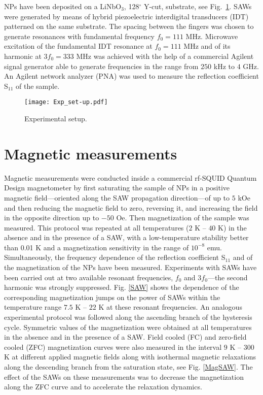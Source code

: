 \documentclass[aps,prb,floats,twocolumn]{revtex4}
\begin{document}
NPs have been deposited on a LiNbO$_{3}$, 128$^{\circ}$ Y-cut, substrate, see Fig.\ \ref{setup}. SAWs were generated by means of hybrid piezoelectric interdigital transducers (IDT) patterned on the same substrate. The spacing between the fingers was chosen to generate resonances with fundamental frequency $f_{0}=111$ MHz. Microwave excitation of the fundamental IDT resonance at $f_{0}=111$ MHz and of its harmonic at $3f_{0}=333$ MHz was achieved with the help of a commercial Agilent signal generator able to generate frequencies in the range from $250$ kHz to $4$ GHz. An Agilent network analyzer (PNA) was used to measure the reflection coefficient S$_{11}$ of the sample.
 
\begin{figure}[ht]
\begin{center}
\texttt{[image: Exp\_set-up.pdf]}
\caption{Experimental setup.}
\label{setup}
\end{center}
\end{figure}

\section{Magnetic measurements}\label{magnetic}
Magnetic measurements were conducted inside a commercial rf-SQUID Quantum Design magnetometer by first saturating the sample of NPs in a positive magnetic field---oriented along the SAW propagation direction---of up to $5$ kOe and then reducing the magnetic field to zero, reversing it, and increasing the field in the opposite direction up to $-50$ Oe. Then magnetization of the sample was measured. This protocol was repeated at all temperatures ($2$ K -- $40$ K) in the absence and in the presence of a SAW, with a low-temperature stability better than 0.01 K and a magnetization sensitivity in the range of $10^{-8}$ emu.\cite{SQUID} Simultaneously, the frequency dependence of the reflection coefficient S$_{11}$ and of the magnetization of the NPs have been measured. Experiments with SAWs have been carried out at two available resonant frequencies, $f_{0}$ and $3f_{0}$---the second harmonic was strongly suppressed. Fig. \ref{SAW} shows the dependence of the corresponding magnetization jumps on the power of SAWs within the temperature range $7.5$ K -- $22$ K at these resonant frequencies. An analogous experimental protocol was followed along the ascending branch of the hysteresis cycle. Symmetric values of the magnetization were obtained at all temperatures in the absence and in the presence of a SAW. Field cooled (FC) and zero-field cooled (ZFC) magnetization curves were also measured in the interval $9$ K -- $300$ K at different applied magnetic fields along with isothermal magnetic relaxations along the descending branch from the saturation state, see Fig. \ref{MagSAW}. The effect of the SAWs on these measurements was to decrease the magnetization along the ZFC curve and to accelerate the relaxation dynamics.
\end{document}
